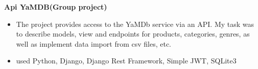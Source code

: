 \documentclass{clean_cv}
\begin{document}
   \textbf{Api YaMDB(Group project)}\href{https://github.com/Chinpakamon/api_yamdb/tree/master}{\color{blue}}
 \begin{itemize}
   \item  The project provides access to the YaMDb service via an API. My task was to describe models, view and endpoints for products, categories, genres, as well as implement data import from csv files, etc.
   \item used Python, Django, Django Rest Framework, Simple JWT, SQLite3
   \end{itemize}
\end{document}
